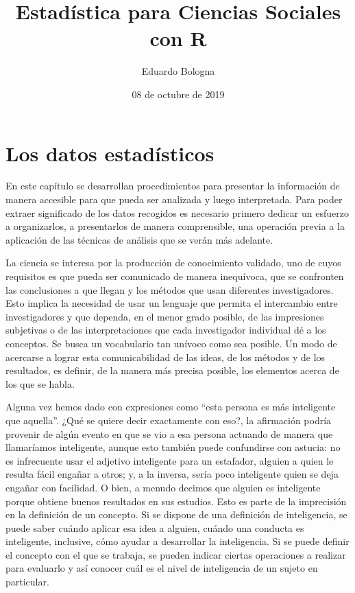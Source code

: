 \documentclass[]{book}
\title{Estadística para Ciencias Sociales con R}
\author{Eduardo Bologna}
\date{08 de octubre de 2019}
\begin{document}
\maketitle

{
\hypersetup{linkcolor=black}
\setcounter{tocdepth}{1}
\tableofcontents
}
\listoftables
\listoffigures
\hypertarget{section}{%
\chapter*{}\label{section}}

\hypertarget{los-datos-estaduxedsticos}{%
\chapter{Los datos estadísticos}\label{los-datos-estaduxedsticos}}

En este capítulo se desarrollan procedimientos para presentar la información de manera accesible para que pueda ser analizada y luego interpretada. Para poder extraer significado de los datos recogidos es necesario primero dedicar un esfuerzo a organizarlos, a presentarlos de manera comprensible, una operación previa a la aplicación de las técnicas de análisis que se verán más adelante.

La ciencia se interesa por la producción de conocimiento validado, uno de cuyos requisitos es que pueda ser comunicado de manera inequívoca, que se confronten las conclusiones a que llegan y los métodos que usan diferentes investigadores. Esto implica la necesidad de usar un lenguaje que permita el intercambio entre investigadores y que dependa, en el menor grado posible, de las impresiones subjetivas o de las interpretaciones que cada investigador individual dé a los conceptos. Se busca un vocabulario tan unívoco como sea posible. Un modo de acercarse a lograr esta comunicabilidad de las ideas, de los métodos y de los resultados, es definir, de la manera más precisa posible, los elementos acerca de los que se habla.

Alguna vez hemos dado con expresiones como ``esta persona es más inteligente que aquella''. ¿Qué se quiere decir exactamente con eso?, la afirmación podría provenir de algún evento en que se vio a esa persona actuando de manera que llamaríamos inteligente, aunque esto también puede confundirse con astucia: no es infrecuente usar el adjetivo inteligente para un estafador, alguien a quien le resulta fácil engañar a otros; y, a la inversa, sería poco inteligente quien se deja engañar con facilidad. O bien, a menudo decimos que alguien es inteligente porque obtiene buenos resultados en sus estudios. Esto es parte de la imprecisión en la definición de un concepto. Si se dispone de una definición de inteligencia, se puede saber cuándo aplicar esa idea a alguien, cuándo una conducta es inteligente, inclusive, cómo ayudar a desarrollar la inteligencia. Si se puede definir el concepto con el que se trabaja, se pueden indicar ciertas operaciones a realizar para evaluarlo y así conocer cuál es el nivel de inteligencia de un sujeto en particular.
\end{document}
